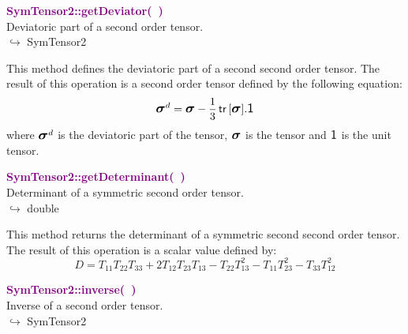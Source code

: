 \textcolor{purple}{\textbf{SymTensor2::getDeviator(~)}}\label{SymTensor2::getDeviator()}\\
Deviatoric part of a second order tensor.\\ \hspace*{10mm}$\hookrightarrow$ SymTensor2

This method defines the deviatoric part of a second second order tensor.
The result of this operation is a second order tensor defined by the following equation:
\begin{equation*}
\mbox{\large\ensuremath{\boldsymbol{\sigma}}}^d=\mbox{\large\ensuremath{\boldsymbol{\sigma}}}-\frac{1}{3}\mbox{\ensuremath{\mathsf{\,tr\,}}}[\mbox{\large\ensuremath{\boldsymbol{\sigma}}}].\mbox{\large\ensuremath{\mathsf{1}}}
\end{equation*}
where $\mbox{\large\ensuremath{\boldsymbol{\sigma}}}^d$ is the deviatoric part of the tensor, $\mbox{\large\ensuremath{\boldsymbol{\sigma}}}$ is the tensor and $\mbox{\large\ensuremath{\mathsf{1}}}$ is the unit tensor.

\textcolor{purple}{\textbf{SymTensor2::getDeterminant(~)}}\label{SymTensor2::getDeterminant()}\\
Determinant of a symmetric second order tensor.\\ \hspace*{10mm}$\hookrightarrow$ double

This method returns the determinant of a symmetric second second order tensor.
The result of this operation is a scalar value defined by:
\begin{equation*}
D = T_{11} T_{22} T_{33} + 2 T_{12} T_{23} T_{13} - T_{22} T_{13}^2 - T_{11} T_{23}^2 - T_{33} T_{12}^2
\end{equation*}

\textcolor{purple}{\textbf{SymTensor2::inverse(~)}}\label{SymTensor2::inverse()}\\
Inverse of a second order tensor.\\ \hspace*{10mm}$\hookrightarrow$ SymTensor2

